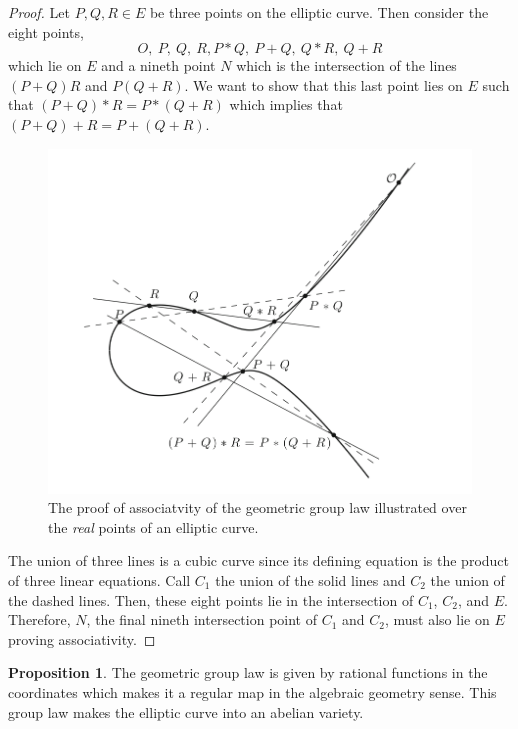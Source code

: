 \documentclass{article}
\theoremstyle{definition}
\newtheorem{proposition}[theorem]{Proposition}
\begin{document}
\begin{proof}
Let $P,Q,R \in E$ be three points on the elliptic curve. Then consider the eight points, 
\[ O, \: P, \: Q, \: R, P * Q, \: P + Q, \: Q * R, \: Q + R\]
which lie on $E$ and a nineth point $N$ which is the intersection of the lines $(P + Q) R$ and $P(Q + R)$. We want to show that this last point lies on $E$ such that $(P + Q) * R = P * (Q + R)$ which implies that $(P + Q) + R = P + (Q + R)$.
\begin{figure}[H]
\begin{center}
\includegraphics[scale=0.5]{EC4}
\caption{The proof of associatvity of the geometric group law illustrated over the \textit{real} points of an elliptic curve.}
\end{center}
\end{figure}
The union of three lines is a cubic curve since its defining equation is the product of three linear equations. Call $C_1$ the union of the solid lines and $C_2$ the union of the dashed lines. Then, these eight points lie in the intersection of $C_1$, $C_2$, and $E$. Therefore, $N$, the final nineth intersection point of $C_1$ and $C_2$, must also lie on $E$ proving associativity. 
\end{proof}

\begin{proposition}
The geometric group law is given by rational functions in the coordinates which makes it a regular map in the algebraic geometry sense. This group law makes the elliptic curve into an abelian variety. 
\end{proposition}
\end{document}
